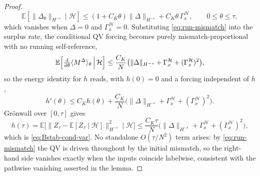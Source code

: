 \documentclass[a4paper,fleqn]{cas-sc}
\theoremstyle{definition}
\theoremstyle{remark}
\begin{document}
\begin{proof}
\begin{equation}
\mathbb E[\|\Delta_\theta\|_{H^{-s}}\mid\mathcal H]\le(1+C_K\theta)\|\Delta\|_{H^{-s}}+C_K\theta\,\Gamma_x^{\mathcal H},
\qquad 0\le\theta\le\tau,
\end{equation}
which vanishes when $\Delta=0$ and $\Gamma_x^{\mathcal H}=0$. Substituting
\eqref{eq:run-mismatch} into the surplus rate, the conditional QV forcing becomes
purely mismatch-proportional with no running self-reference,
\[
\mathbb E\Bigl[\tfrac{\mathrm d}{\mathrm d\theta}\langle M^\Delta\rangle_\theta\,\Big|\,\mathcal H\Bigr]
\le\frac{C_K}{N}\bigl(\|\Delta\|_{H^{-s}}+\Gamma_x^{\mathcal H}+(\Gamma_x^{\mathcal H})^2\bigr),
\]
so the energy identity for $h$ reads, with $h(0)=0$ and a forcing independent of $h$,
\[
h'(\theta)\le C_Kh(\theta)+\frac{C_K}{N}\bigl(\|\Delta\|_{H^{-s}}+\Gamma_x^{\mathcal H}+(\Gamma_x^{\mathcal H})^2\bigr).
\]
Gr\"onwall over $[0,\tau]$ gives
\[
h(\tau)=\mathbb E\bigl[\|Z_\tau-\mathbb E[Z_\tau\mid\mathcal H]\|_{H^{-s}}^2\mid\mathcal H\bigr]
\le\frac{C_K\tau}{N}\bigl(\|\Delta\|_{H^{-s}}+\Gamma_x^{\mathcal H}+(\Gamma_x^{\mathcal H})^2\bigr),
\]
which is \eqref{eq:Bstab-cond-var}. No standalone $O(\tau/N^2)$ term arises: by
\eqref{eq:run-mismatch} the QV is driven throughout by the initial mismatch, so the
right-hand side vanishes exactly when the inputs coincide labelwise, consistent with
the pathwise vanishing asserted in the lemma.


\end{proof}
\end{document}
